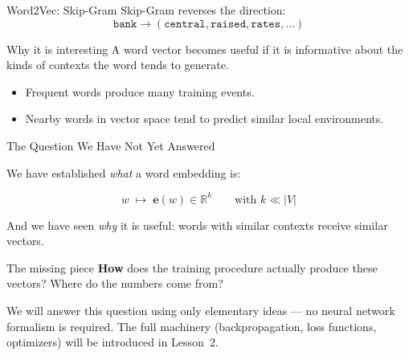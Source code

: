 \documentclass[aspectratio=169]{beamer}
\begin{document}
%
%
\begin{frame}{Word2Vec: Skip-Gram}
Skip-Gram reverses the direction:
\[
\texttt{bank} \longrightarrow (\texttt{central},\texttt{raised},\texttt{rates},\dots)
\]

\vspace{0.15cm}
\begin{block}{Why it is interesting}
A word vector becomes useful if it is informative about the kinds of contexts the word tends to generate.
\end{block}

\vspace{0.12cm}
\begin{itemize}
    \item Frequent words produce many training events.
    \item Nearby words in vector space tend to predict similar local environments.
\end{itemize}
\end{frame}
%
%
\begin{frame}{The Question We Have Not Yet Answered}

We have established \emph{what} a word embedding is:

\[
  w \;\longmapsto\; \mathbf{e}(w) \in \mathbb{R}^k
  \qquad\text{with } k \ll |V|
\]

And we have seen \emph{why} it is useful: words with similar
contexts receive similar vectors.

\vspace{12pt}
\begin{alertblock}{The missing piece}
\textbf{How} does the training procedure actually produce
these vectors?  Where do the numbers come from?

\vspace{4pt}
We will answer this question using only elementary ideas
--- no neural network formalism is required.
The full machinery (backpropagation, loss functions,
optimizers) will be introduced in Lesson~2.
\end{alertblock}

\end{frame}
%
%
\end{document}
